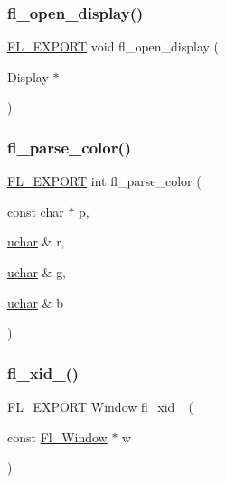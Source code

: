 \mbox{\label{x_8_h_a3704304ea83f4dcaf4d226779838a6e3}} 
\subsubsection{\texorpdfstring{fl\+\_\+open\+\_\+display()}{fl\_open\_display()}\hspace{0.1cm}{\footnotesize\ttfamily [2/2]}}
{\footnotesize\ttfamily \hyperlink{_fl___export_8_h_aa9ba29a18aee9d738370a06eeb4470fc}{F\+L\+\_\+\+E\+X\+P\+O\+RT} void fl\+\_\+open\+\_\+display (\begin{DoxyParamCaption}\item[{Display $\ast$}]{ }\end{DoxyParamCaption})}

\mbox{\label{x_8_h_a0a5c5c56a06c3e23e509e6c0125e95e7}} 
\subsubsection{\texorpdfstring{fl\+\_\+parse\+\_\+color()}{fl\_parse\_color()}}
{\footnotesize\ttfamily \hyperlink{_fl___export_8_h_aa9ba29a18aee9d738370a06eeb4470fc}{F\+L\+\_\+\+E\+X\+P\+O\+RT} int fl\+\_\+parse\+\_\+color (\begin{DoxyParamCaption}\item[{const char $\ast$}]{p,  }\item[{\hyperlink{fl__types_8h_a65f85814a8290f9797005d3b28e7e5fc}{uchar} \&}]{r,  }\item[{\hyperlink{fl__types_8h_a65f85814a8290f9797005d3b28e7e5fc}{uchar} \&}]{g,  }\item[{\hyperlink{fl__types_8h_a65f85814a8290f9797005d3b28e7e5fc}{uchar} \&}]{b }\end{DoxyParamCaption})}

\mbox{\label{x_8_h_a4daabfb0d38b46de684f3d88af173299}} 
\subsubsection{\texorpdfstring{fl\+\_\+xid\+\_\+()}{fl\_xid\_()}}
{\footnotesize\ttfamily \hyperlink{_fl___export_8_h_aa9ba29a18aee9d738370a06eeb4470fc}{F\+L\+\_\+\+E\+X\+P\+O\+RT} \hyperlink{mac_8_h_a213656d363e884b651cc92f58e863fc6}{Window} fl\+\_\+xid\+\_\+ (\begin{DoxyParamCaption}\item[{const \hyperlink{class_fl___window}{Fl\+\_\+\+Window} $\ast$}]{w }\end{DoxyParamCaption})}

